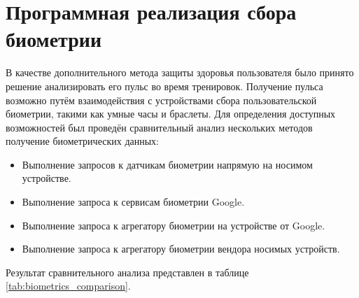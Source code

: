 \chapter{Программная реализация сбора биометрии}
В качестве дополнительного метода защиты здоровья пользователя было принято решение анализировать его пульс во время тренировок.
Получение пульса возможно путём взаимодействия с устройствами сбора пользовательской биометрии, такими как умные часы и браслеты.
Для определения доступных возможностей был проведён сравнительный анализ нескольких методов получение биометрических данных:
\begin{itemize}
	\item Выполнение запросов к датчикам биометрии напрямую на носимом устройстве.
	\item Выполнение запроса к сервисам биометрии Google.
	\item Выполнение запроса к агрегатору биометрии на устройстве от Google.
	\item Выполнение запроса к агрегатору биометрии вендора носимых устройств.
\end{itemize}
\smallskip
Результат сравнительного анализа представлен в таблице \ref{tab:biometrics_comparison}.

\newcolumntype{b}{X}


